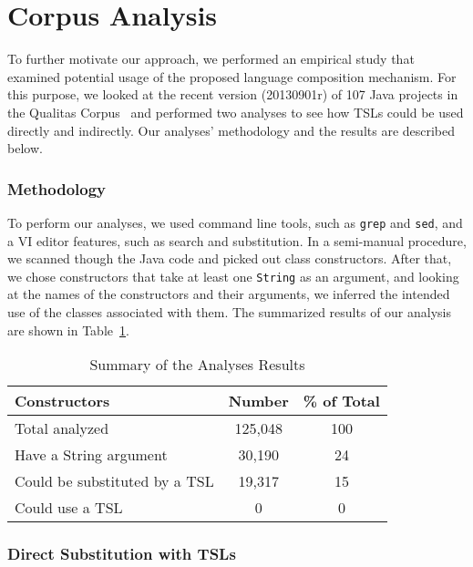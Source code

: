 \section{Corpus Analysis}
\label{s:study}
To further motivate our approach, we performed an empirical study that examined potential usage of the proposed language composition mechanism. For this purpose, we looked at the recent version (20130901r) of 107 Java projects in the Qualitas Corpus~\cite{QualitasCorpus:APSEC:2010} and performed two analyses to see how TSLs could be used directly and indirectly. Our analyses' methodology and the results are described below.

\subsubsection{Methodology}

To perform our analyses, we used command line tools, such as \lstinline{grep} and \lstinline{sed}, and a VI editor features, such as search and substitution. In a semi-manual procedure, we scanned though the Java code and picked out class constructors. After that, we chose constructors that take at least one \lstinline{String} as an argument, and looking at the names of the constructors and their arguments, we inferred the intended use of the classes associated with them. The summarized results of our analysis are shown in Table~\ref{t-summary}.

\begin{table}
   \centering
    \begin{tabular}{l | c | c}
    \bf Constructors & \bf Number & \bf \% of Total \\ \hline
    Total analyzed & 125,048 & 100 \\
    Have a String argument & 30,190 & 24 \\
    Could be substituted by a TSL & 19,317 & 15 \\
    Could use a TSL & 0 & 0 \\
    \end{tabular}
    \vspace{0.15in}
    \caption{Summary of the Analyses Results}
    \label{t-summary}
\end{table}

\subsubsection{Direct Substitution with TSLs}

